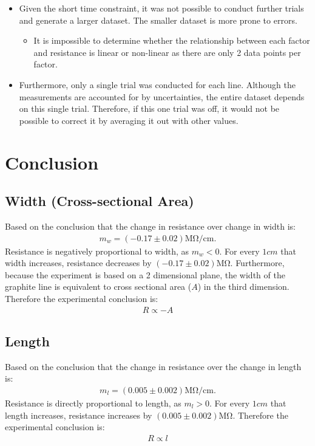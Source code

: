 \documentclass[12pt]{article}
\begin{document}
\begin{itemize}
    \item Given the short time constraint, it was not possible to conduct further trials and generate a larger dataset. The smaller dataset is more prone to errors.
    \begin{itemize}
        \item It is impossible to determine whether the relationship between each factor and resistance is linear or non-linear as there are only 2 data points per factor.
    \end{itemize}
    \item Furthermore, only a single trial was conducted for each line. Although the measurements are accounted for by uncertainties, the entire dataset depends on this single trial. Therefore, if this one trial was off, it would not be possible to correct it by averaging it out with other values.
\end{itemize}

\section{Conclusion}

\subsection{Width (Cross-sectional Area)}

Based on the conclusion that the change in resistance over change in width is:
\begin{gather*}
    m_w = (-0.17 \pm 0.02) \si{\mega\ohm\per\cm}.
\end{gather*}
Resistance is negatively proportional to width, as $m_w < 0$. For every $1\si{cm}$ that width increases, resistance decreases by $(-0.17 \pm 0.02)\si{\mega\ohm}$. Furthermore, because the experiment is based on a 2 dimensional plane, the width of the graphite line is equivalent to cross sectional area ($A$) in the third dimension. Therefore the experimental conclusion is:
\begin{gather*}
    R \propto -A
\end{gather*}

\subsection{Length}

Based on the conclusion that the change in resistance over the change in length is:
\begin{gather*}
    m_l = (0.005 \pm 0.002) \si{\mega\ohm\per\cm}.
\end{gather*}
Resistance is directly proportional to length, as $m_l > 0$. For every $1\si{cm}$ that length increases, resistance increases by $(0.005 \pm 0.002)\si{\mega\ohm}$. Therefore the experimental conclusion is:
\begin{gather*}
    R \propto l
\end{gather*}
\end{document}
